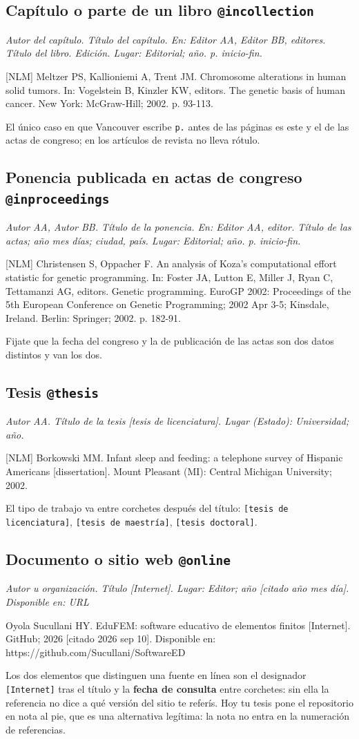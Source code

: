 \documentclass[11pt,a4paper]{article}
\newcommand{\refv}[1]{\par{\small #1}\par}
\newcommand{\plantilla}[1]{\par{\small\itshape\color{tinta} #1}\par}
\newcommand{\anot}[1]{{\color{gris}\footnotesize #1}}
\begin{document}
\subsection*{Capítulo o parte de un libro \hfill \normalfont\small\texttt{@incollection}}
\plantilla{Autor del capítulo. Título del capítulo. En: Editor AA, Editor BB, editores.
Título del libro. Edición. Lugar: Editorial; año. p. inicio-fin.}
\refv{\anot{[NLM]} Meltzer PS, Kallioniemi A, Trent JM. Chromosome alterations in human solid
tumors. In: Vogelstein B, Kinzler KW, editors. The genetic basis of human cancer. New York:
McGraw-Hill; 2002. p. 93-113.}
\anot{El único caso en que Vancouver escribe \texttt{p.} antes de las páginas es este y el de
las actas de congreso; en los artículos de revista no lleva rótulo.}

\subsection*{Ponencia publicada en actas de congreso \hfill \normalfont\small\texttt{@inproceedings}}
\plantilla{Autor AA, Autor BB. Título de la ponencia. En: Editor AA, editor. Título de las
actas; año mes días; ciudad, país. Lugar: Editorial; año. p. inicio-fin.}
\refv{\anot{[NLM]} Christensen S, Oppacher F. An analysis of Koza's computational effort
statistic for genetic programming. In: Foster JA, Lutton E, Miller J, Ryan C, Tettamanzi AG,
editors. Genetic programming. EuroGP 2002: Proceedings of the 5th European Conference on
Genetic Programming; 2002 Apr 3-5; Kinsdale, Ireland. Berlin: Springer; 2002. p. 182-91.}
\anot{Fijate que la fecha del congreso y la de publicación de las actas son dos datos
distintos y van los dos.}

\subsection*{Tesis \hfill \normalfont\small\texttt{@thesis}}
\plantilla{Autor AA. Título de la tesis [tesis de licenciatura]. Lugar (Estado):
Universidad; año.}
\refv{\anot{[NLM]} Borkowski MM. Infant sleep and feeding: a telephone survey of Hispanic
Americans [dissertation]. Mount Pleasant (MI): Central Michigan University; 2002.}
\anot{El tipo de trabajo va entre corchetes después del título: \texttt{[tesis de
licenciatura]}, \texttt{[tesis de maestría]}, \texttt{[tesis doctoral]}.}

\subsection*{Documento o sitio web \hfill \normalfont\small\texttt{@online}}
\plantilla{Autor u organización. Título [Internet]. Lugar: Editor; año [citado año mes día].
Disponible en: URL}
\refv{Oyola Sucullani HY. EduFEM: software educativo de elementos finitos [Internet]. GitHub;
2026 [citado 2026 sep 10]. Disponible en: https://github.com/Sucullani/SoftwareED}
\anot{Los dos elementos que distinguen una fuente en línea son el designador
\texttt{[Internet]} tras el título y la \textbf{fecha de consulta} entre corchetes: sin ella la
referencia no dice a qué versión del sitio te referís. Hoy tu tesis pone el repositorio en
nota al pie, que es una alternativa legítima: la nota no entra en la numeración de
referencias.}
\end{document}
